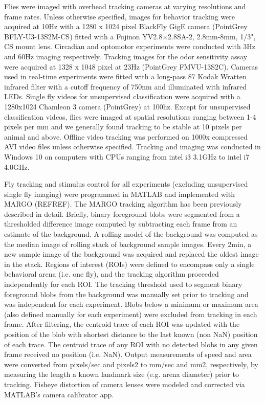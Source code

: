 \documentclass[12pt,letterpaper]{article}
\begin{document}
Flies were imaged with overhead tracking cameras at varying resolutions and frame rates. Unless otherwise specified, images for behavior tracking were acquired at 10Hz with a 1280 x 1024 pixel BlackFly GigE camera (PointGrey BFLY-U3-13S2M-CS) fitted with a Fujinon YV2.8×2.8SA-2, 2.8mm-8mm, 1/3", CS mount lens. Circadian and optomotor experiments were conducted with 3Hz and 60Hz imaging respectively. Tracking images for the odor sensitivity assay were acquired at 1328 x 1048 pixel at 23Hz (PointGrey FMVU-13S2C). Cameras used in real-time experiments were fitted with a long-pass 87 Kodak Wratten infrared filter with a cutoff frequency of 750nm and illuminated with infrared LEDs. Single fly videos for unsupervised classification were acquired with a 1280x1024 Chamleon 3 camera (PointGrey) at 100hz. Except for unsupervised classification videos, flies were imaged at spatial resolutions ranging between 1-4 pixels per mm and we generally found tracking to be stable at 10 pixels per animal and above. Offline video tracking was performed on 1000x compressed AVI video files unless otherwise specified. Tracking and imaging was conducted in Windows 10 on computers with CPUs ranging from intel i3 3.1GHz to intel i7 4.0GHz.

Fly tracking and stimulus control for all experiments (excluding unsupervised single fly imaging) were programmed in MATLAB and implemented with MARGO (REFREF). The MARGO tracking algorithm has been previously described in detail. Briefly, binary foreground blobs were segmented from a thresholded difference image computed by subtracting each frame from an estimate of the background. A rolling model of the background was computed as the median image of rolling stack of background sample images. Every 2min, a new sample image of the background was acquired and replaced the oldest image in the stack. Regions of interest (ROIs) were defined to encompass only a single behavioral arena (i.e. one fly), and the tracking algorithm proceeded independently for each ROI. The tracking threshold used to segment binary foreground blobs from the background was manually set prior to tracking and was independent for each experiment. Blobs below a minimum or maximum area (also defined manually for each experiment) were excluded from tracking in each frame. After filtering, the centroid trace of each ROI was updated with the position of the blob with shortest distance to the last known (non NaN) position of each trace. The centroid trace of any ROI with no detected blobs in any given frame received no position (i.e. NaN). Output measurements of speed and area were converted from pixels/sec and pixels2 to mm/sec and mm2, respectively, by measuring the length a known landmark size (e.g. arena diameter) prior to tracking. Fisheye distortion of camera lenses were modeled and corrected via MATLAB’s camera calibrator app.
\end{document}
